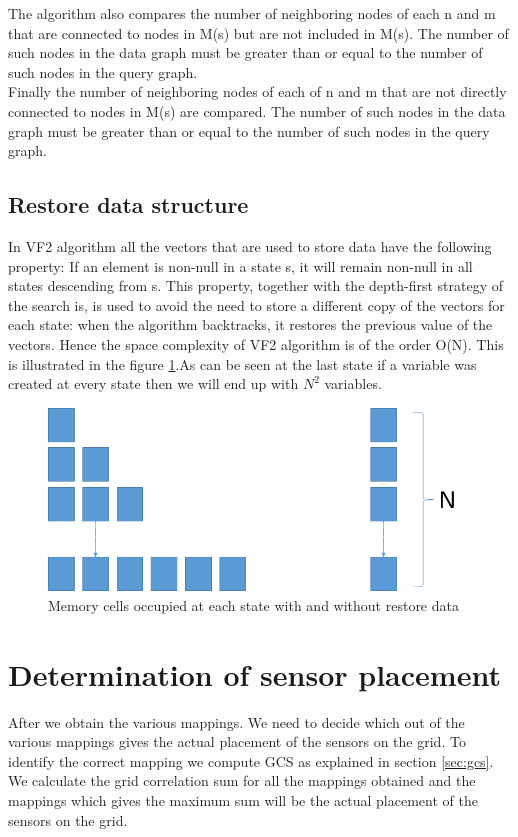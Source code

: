 The algorithm also compares the number of neighboring nodes of each n and m that are connected to nodes in M(s) but are not
included in M(s). The number of such nodes in the data graph must be greater than or equal to the number of such nodes in the query graph.\\

Finally the number of neighboring nodes of each of n and m that are not directly connected to nodes in M(s) are compared. The number of 
such nodes in the data graph must be greater than or equal to the number of such nodes in the query graph.

\subsection{Restore data structure}
In VF2 algorithm all the vectors that are used to store data have the following property: If an element is non-null in a state s, it will remain non-null in all states descending from s. This property, together with the depth-first strategy of the search is, is used to avoid the need to store a different copy of the vectors for each state: when the algorithm backtracks, it restores the previous value of the vectors. Hence the space complexity of VF2 algorithm is of the order O(N). This is illustrated in the figure \ref{fig:memManagement}.As can be seen at the last state if a variable was created at every state then we will end up with $N^2$ variables.

\begin{figure}
\includegraphics[scale=0.5]{./pics/memManagement.png}
\caption{Memory cells occupied at each state with and without restore data}
\label{fig:memManagement}
\centering
\end{figure}

\section{Determination of sensor placement}
\label{ref:rotationalSym}
After we obtain the various mappings. We need to decide which out of the various mappings gives the actual placement of the sensors on the grid. To identify the correct mapping we compute GCS as explained in section \ref{sec:gcs}. We calculate the grid correlation sum for all the mappings obtained and the mappings which gives the maximum sum will be the actual placement of the sensors on the grid. 
